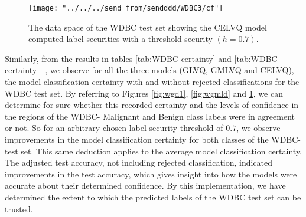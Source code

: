 \begin{figure}[H]
	\centering
	\texttt{[image: "../../../send from/sendddd/WDBC3/cf"]}
	\caption[WDBC test set classification label security (CELVQ)]{The data space of the WDBC test set showing the CELVQ model computed label securities with a threshold security $(h=0.7)$.}
	\label{fig:cdl}
\end{figure}



Similarly, from the results in tables \ref{tab:WDBC certainty} and \ref{tab:WDBC certainty_}, we observe for all the three models (GLVQ, GMLVQ and CELVQ), the model classification certainty with and without rejected classifications for the WDBC test set. By referring to Figures \ref{fig:wgd1}, \ref{fig:wgmld} and \ref{fig:cdl}, we can determine for sure whether this recorded certainty and the levels of confidence in the regions of the WDBC- Malignant and Benign class labels were in agreement or not. So for an arbitrary chosen label security threshold of\hspace{2pt} $0.7$, we observe improvements in the model classification certainty for both classes of the WDBC-test set. This same deduction applies to the average model classification certainty. The adjusted test accuracy, not including rejected classification, indicated improvements in the test accuracy, which gives insight into how the models were accurate about their determined confidence.
By this implementation, we have determined the extent to which the predicted labels of the WDBC test set can be trusted.
